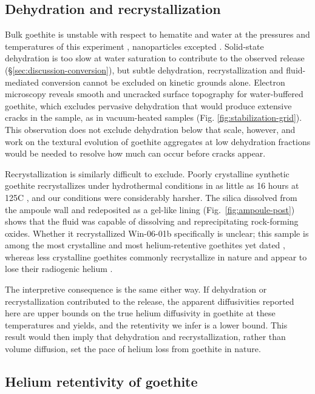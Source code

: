 \subsection{Dehydration and recrystallization}\label{sec:discussion-alteration}

Bulk goethite is unstable with respect to hematite and water at the pressures and temperatures of this experiment \citep{majzlan2003}, nanoparticles excepted \citep{guobarnard2011,navrotsky2008}. Solid-state dehydration is too slow at water saturation to contribute to the observed release (\S\ref{sec:discussion-conversion}), but subtle dehydration, recrystallization and fluid-mediated conversion cannot be excluded on kinetic grounds alone. Electron microscopy reveals smooth and uncracked surface topography for water-buffered goethite, which excludes pervasive dehydration that would produce extensive cracks in the sample, as in vacuum-heated samples (Fig. \ref{fig:stabilization-grid}). This observation does not exclude dehydration below that scale, however, and work on the textural evolution of goethite aggregates at low dehydration fractions would be needed to resolve how much can occur before cracks appear.

Recrystallization is similarly difficult to exclude. Poorly crystalline synthetic goethite recrystallizes under hydrothermal conditions in as little as 16 hours at 125\textdegree C \citep{schwertmann1985}, and our conditions were considerably harsher. The silica dissolved from the ampoule wall and redeposited as a gel-like lining (Fig.~\ref{fig:ampoule-post}) shows that the fluid was capable of dissolving and reprecipitating rock-forming oxides. Whether it recrystallized Win-06-01b specifically is unclear; this sample is among the most crystalline and most helium-retentive goethites yet dated \citep{waltenberg2012,farley2024}, whereas less crystalline goethites commonly recrystallize in nature and appear to lose their radiogenic helium \citep{monteiro2018,monteiro2014,heim2006}.

The interpretive consequence is the same either way. If dehydration or recrystallization contributed to the release, the apparent diffusivities reported here are upper bounds on the true helium diffusivity in goethite at these temperatures and yields, and the retentivity we infer is a lower bound. This result would then imply that dehydration and recrystallization, rather than volume diffusion, set the pace of helium loss from goethite in nature.

\subsection{Helium retentivity of goethite}\label{sec:discussion-retentivity}

